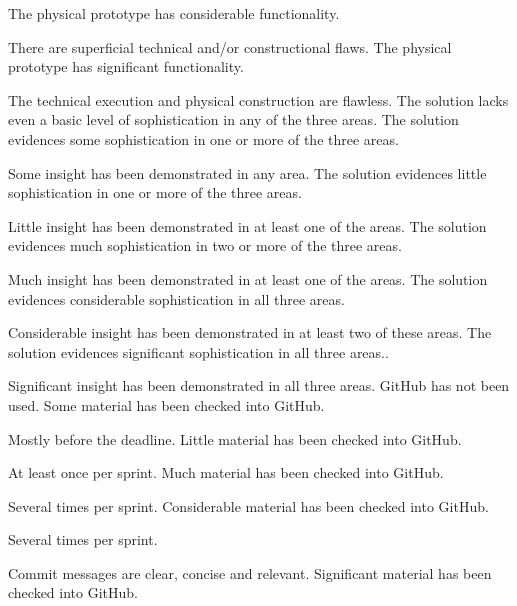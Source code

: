 \documentclass{../fal_assignment}
\begin{document}
\begin{markingrubric}
        \grade The physical prototype has considerable functionality.
            \par There are superficial technical and/or constructional flaws.
        \grade The physical prototype has significant functionality.
            \par The technical execution and physical construction are flawless.
        \grade\fail The solution lacks even a basic level of sophistication in any of the three areas.
        \grade The solution evidences some sophistication in one or more of the three areas.
            \par Some insight has been demonstrated in any area.
        \grade The solution evidences little sophistication in one or more of the three areas.
            \par Little insight has been demonstrated in at least one of the areas.
        \grade The solution evidences much sophistication in two or more of the three areas.
            \par Much insight has been demonstrated in at least one of the areas.
        \grade The solution evidences considerable sophistication in all three areas.
            \par Considerable insight has been demonstrated in at least two of these areas.
        \grade The solution evidences significant sophistication in all three areas..
            \par Significant insight has been demonstrated in all three areas.
        \grade\fail GitHub has not been used.
        \grade Some material has been checked into GitHub.
            \par Mostly before the deadline.
        \grade Little material has been checked into GitHub.
        	   \par  At least once per sprint.
        \grade Much material has been checked into GitHub.
        	   \par Several times per sprint.
        \grade Considerable material has been checked into GitHub.
        	    \par Several times per sprint.
            \par Commit messages are clear, concise and relevant.
        \grade Significant material has been checked into GitHub.

\end{markingrubric}
\end{document}
